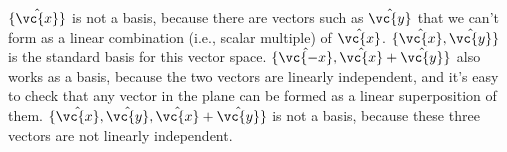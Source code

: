 $\{\hat{\vc{x}}\}$ is not a basis, because there are vectors such as $\hat{\vc{y}}$ that we can't form
as a linear combination (i.e., scalar multiple) of $\hat{\vc{x}}$.
%
$\{\hat{\vc{x}},\hat{\vc{y}}\}$ is the standard basis for this vector space.
%
$\{\hat{\vc{-x}},\hat{\vc{x}}+\hat{\vc{y}}\}$ also works as a basis, because the two
vectors are linearly independent, and it's easy to check that any vector in the plane
can be formed as a linear superposition of them.
%
$\{\hat{\vc{x}},\hat{\vc{y}},\hat{\vc{x}}+\hat{\vc{y}}\}$ is not a basis, because
these three vectors are not linearly independent.
